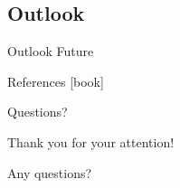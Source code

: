 \documentclass{beamer}
\begin{document}
\subsection{Outlook}
\begin{frame}{Outlook}
  Future
\end{frame}


\appendix
\begin{frame}[allowframebreaks]{References}
  \small
  [book]
  {}
  
\end{frame}

\begin{frame}{Questions?}
  \begin{center}
    Thank you for your attention!

    Any questions?
  \end{center}
\end{frame}
\end{document}
